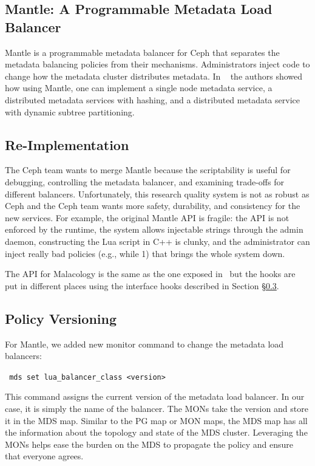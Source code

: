 \documentclass[10pt,twocolumn]{article}
\begin{document}
\subsection{Mantle: A Programmable Metadata Load Balancer}
\label{sec:mantle}

Mantle is a programmable metadata
balancer for Ceph that separates the metadata balancing policies from their
mechanisms. Administrators inject code to change how the metadata cluster
distributes metadata. In ~\cite{sevilla:sc15-mantle} the authors showed how 
using Mantle, one can implement a single node metadata service, a distributed 
metadata services with hashing, and a distributed metadata service with dynamic 
subtree partitioning.

\subsection{Re-Implementation}

The Ceph team wants to merge Mantle because the scriptability is useful
for debugging, controlling the metadata balancer, and examining
trade-offs for different balancers. Unfortunately, this research quality
system is not as robust as Ceph and the Ceph team wants more safety,
durability, and consistency for the new services. For example, the
original Mantle API is fragile: the API is not enforced by the runtime,
the system allows injectable strings through the admin daemon,
constructing the Lua script in C++ is clunky, and the administrator can
inject really bad policies (e.g., while 1) that brings the whole system
down.

The API for Malacology is the same as the one exposed in~\cite{sevilla:sc15-mantle} but the hooks are put in different places using the interface hooks described in Section \S\ref{}.

\subsection{Policy Versioning}

For Mantle, we added new monitor command to change the metadata load balancers:

\noindent \texttt{ mds\ set\ lua\_balancer\_class\ \textless{}version\textgreater{}}

This command assigns the current version of the metadata load balancer. In our case, it is simply the name of the balancer. The MONs take the version and store it in the MDS map. Similar to the PG map or MON maps, the MDS map has all the information about the topology and state of the MDS cluster. Leveraging the MONs helps ease the burden on the MDS to propagate the policy and ensure that everyone agrees.
\end{document}
